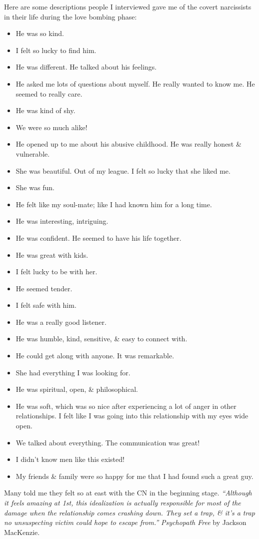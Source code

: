 \documentclass{article}
\numberwithin{equation}{section}
\begin{document}
Here are some descriptions people I interviewed gave me of the covert narcissists in their life during the love bombing phase:
\begin{itemize}
	\item He was so kind.
	\item I felt so lucky to find him.
	\item He was different. He talked about his feelings.
	\item He asked me lots of questions about myself. He really wanted to know me. He seemed to really care.
	\item He was kind of shy.
	\item We were so much alike!
	\item He opened up to me about his abusive childhood. He was really honest \& vulnerable.
	\item She was beautiful. Out of my league. I felt so lucky that she liked me.
	\item She was fun.
	\item He felt like my soul-mate; like I had known him for a long time.
	\item He was interesting, intriguing.
	\item He was confident. He seemed to have his life together.
	\item He was great with kids.
	\item I felt lucky to be with her.
	\item He seemed tender.
	\item I felt safe with him.
	\item He was a really good listener.
	\item He was humble, kind, sensitive, \& easy to connect with.
	\item He could get along with anyone. It was remarkable.
	\item She had everything I was looking for.
	\item He was spiritual, open, \& philosophical.
	\item He was soft, which was so nice after experiencing a lot of anger in other relationships. I felt like I was going into this relationship with my eyes wide open.
	\item We talked about everything. The communication was great!
	\item I didn't know men like this existed!
	\item My friends \& family were so happy for me that I had found such a great guy.
\end{itemize}
Many told me they felt so at east with the CN in the beginning stage. \textit{``Although it feels amazing at 1st, this idealization is actually responsible for most of the damage when the relationship comes crashing down. They set a trap, \& it's a trap no unsuspecting victim could hope to escape from.''} \textit{Psychopath Free} by Jackson MacKenzie.
\end{document}
